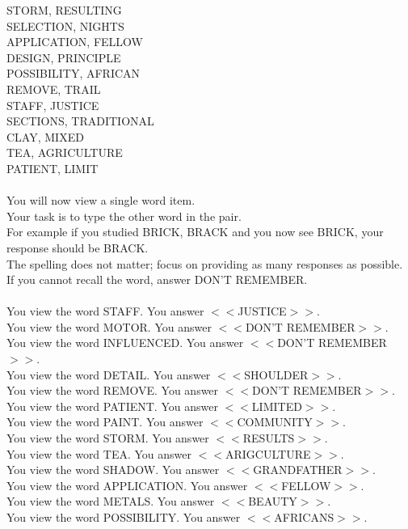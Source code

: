 \documentclass[pdflatex,sn-nature]{sn-jnl}%
\theoremstyle{thmstyleone}%
\theoremstyle{thmstyletwo}%
\theoremstyle{thmstylethree}%
\begin{document}
STORM, RESULTING $~$\\ 
SELECTION, NIGHTS $~$\\ 
APPLICATION, FELLOW $~$\\ 
DESIGN, PRINCIPLE $~$\\ 
POSSIBILITY, AFRICAN $~$\\ 
REMOVE, TRAIL $~$\\ 
STAFF, JUSTICE $~$\\ 
SECTIONS, TRADITIONAL $~$\\ 
CLAY, MIXED $~$\\ 
TEA, AGRICULTURE $~$\\ 
PATIENT, LIMIT $~$\\ 
 $~$\\ 
You will now view a single word item. $~$\\ 
Your task is to type the other word in the pair. $~$\\ 
For example if you studied BRICK, BRACK and you now see BRICK, your response should be BRACK. $~$\\ 
The spelling does not matter; focus on providing as many responses as possible. $~$\\ 
If you cannot recall the word, answer DON'T REMEMBER. $~$\\ 
 $~$\\ 
You view the word STAFF. You answer $<<$JUSTICE$>>$. $~$\\ 
You view the word MOTOR. You answer $<<$DON'T REMEMBER$>>$. $~$\\ 
You view the word INFLUENCED. You answer $<<$DON'T REMEMBER$>>$. $~$\\ 
You view the word DETAIL. You answer $<<$SHOULDER$>>$. $~$\\ 
You view the word REMOVE. You answer $<<$DON'T REMEMBER$>>$. $~$\\ 
You view the word PATIENT. You answer $<<$LIMITED$>>$. $~$\\ 
You view the word PAINT. You answer $<<$COMMUNITY$>>$. $~$\\ 
You view the word STORM. You answer $<<$RESULTS$>>$. $~$\\ 
You view the word TEA. You answer $<<$ARIGCULTURE$>>$. $~$\\ 
You view the word SHADOW. You answer $<<$GRANDFATHER$>>$. $~$\\ 
You view the word APPLICATION. You answer $<<$FELLOW$>>$. $~$\\ 
You view the word METALS. You answer $<<$BEAUTY$>>$. $~$\\ 
You view the word POSSIBILITY. You answer $<<$AFRICANS$>>$. $~$\\ 
\end{document}
